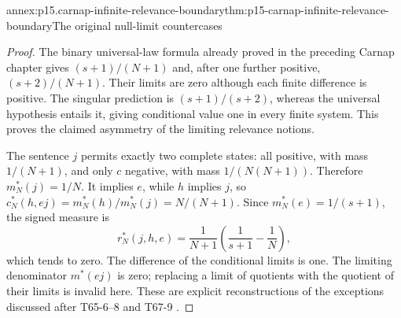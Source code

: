 \begin{annexitem}{annex:p15.carnap-infinite-relevance-boundary}{thm:p15-carnap-infinite-relevance-boundary}{The original null-limit countercases}
\begin{proof}
The binary universal-law formula already proved in the preceding
Carnap chapter gives \((s+1)/(N+1)\) and, after one further
positive, \((s+2)/(N+1)\). Their limits are zero although each
finite difference is positive. The singular prediction is
\((s+1)/(s+2)\), whereas the universal hypothesis entails it,
giving conditional value one in every finite system. This proves the
claimed asymmetry of the limiting relevance notions.

The sentence \(j\) permits exactly two complete states: all positive,
with mass \(1/(N+1)\), and only \(c\) negative, with mass
\(1/(N(N+1))\). Therefore \(m_N^*(j)=1/N\).
It implies \(e\), while \(h\) implies \(j\), so
\(c_N^*(h,ej)=m_N^*(h)/m_N^*(j)=N/(N+1)\).
Since \(m_N^*(e)=1/(s+1)\), the signed measure is
\[
 r_N^*(j,h,e)=\frac1{N+1}\left(\frac1{s+1}-\frac1N\right),
\]
which tends to zero. The difference of the conditional limits is one.
The limiting denominator \(m^*(ej)\) is zero; replacing a limit
of quotients with the quotient of their limits is invalid here.
These are explicit reconstructions of the exceptions discussed after
T65-6--8 and T67-9 \cite{Carnap1950Probability}.
\end{proof}
\end{annexitem}
